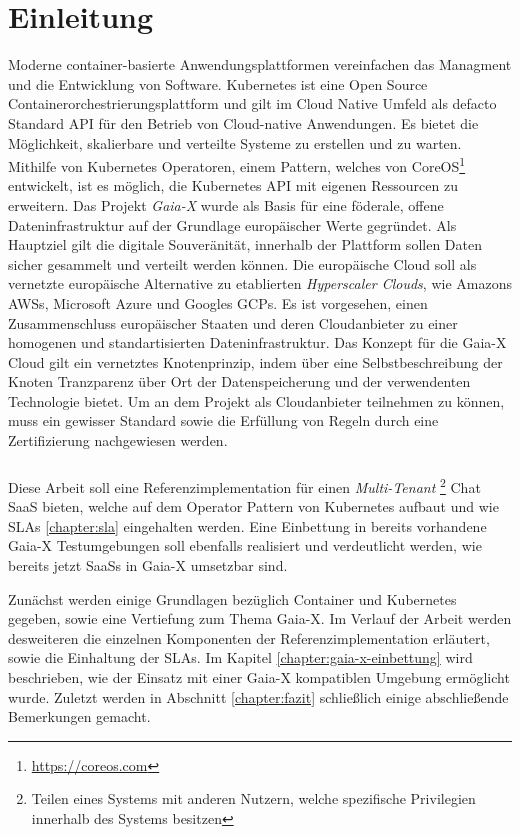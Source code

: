 \chapter{Einleitung}

Moderne container-basierte Anwendungsplattformen vereinfachen das Managment und die Entwicklung
von Software. Kubernetes \cite{kubernetes} ist eine Open Source Containerorchestrierungsplattform und gilt im
Cloud Native Umfeld als defacto Standard API für den Betrieb von Cloud-native Anwendungen.
Es bietet die Möglichkeit, skalierbare und verteilte Systeme zu erstellen und zu warten. \cite{Burns2019}
Mithilfe von Kubernetes Operatoren, einem Pattern, welches von CoreOS\footnote{\url{https://coreos.com}} entwickelt,
ist es möglich, die Kubernetes API mit eigenen Ressourcen zu erweitern.
Das Projekt \emph{Gaia-X} wurde als Basis für eine föderale, offene Dateninfrastruktur auf der Grundlage europäischer Werte gegründet.
Als Hauptziel gilt die digitale Souveränität, innerhalb der Plattform sollen Daten sicher gesammelt und verteilt werden können.
Die europäische Cloud soll als vernetzte europäische Alternative zu etablierten \emph{Hyperscaler Clouds}, wie Amazons \acp{AWS},
Microsoft Azure und Googles \acp{GCP}. Es ist vorgesehen, einen Zusammenschluss europäischer Staaten und deren
Cloudanbieter zu einer homogenen und standartisierten Dateninfrastruktur.
Das Konzept für die Gaia-X Cloud gilt ein vernetztes Knotenprinzip, indem über eine Selbstbeschreibung der Knoten
Tranzparenz über Ort der Datenspeicherung und der verwendenten Technologie bietet. Um an dem Projekt als Cloudanbieter
teilnehmen zu können, muss ein gewisser Standard sowie die Erfüllung von Regeln durch eine Zertifizierung nachgewiesen werden.\cite{BMWi2019}

\paragraph{}
Diese Arbeit soll eine Referenzimplementation für einen \emph{Multi-Tenant}
\footnote{Teilen eines Systems mit anderen Nutzern, welche spezifische Privilegien innerhalb des Systems besitzen}
Chat \ac{SaaS} bieten, welche auf dem Operator Pattern von Kubernetes aufbaut und wie \acp{SLA} \ref{chapter:sla} eingehalten werden.
Eine Einbettung in bereits vorhandene Gaia-X Testumgebungen soll ebenfalls realisiert und verdeutlicht werden,
wie bereits jetzt \acp{SaaS} in Gaia-X umsetzbar sind.

Zunächst werden einige Grundlagen bezüglich Container und Kubernetes gegeben, sowie eine Vertiefung zum Thema Gaia-X.
Im Verlauf der Arbeit werden desweiteren die einzelnen Komponenten der Referenzimplementation erläutert, sowie die Einhaltung der \acp{SLA}.
Im Kapitel \ref{chapter:gaia-x-einbettung} wird beschrieben, wie der Einsatz mit einer Gaia-X kompatiblen Umgebung ermöglicht wurde.
Zuletzt werden in Abschnitt \ref{chapter:fazit} schließlich einige abschließende Bemerkungen gemacht.